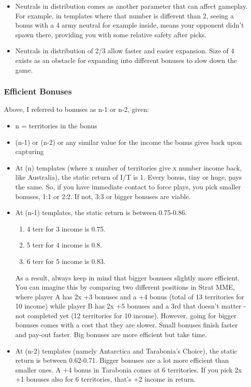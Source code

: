 \begin{itemize}
\begin{enumerate}
\begin{itemize}
            \item Neutrals in distribution comes as another parameter that can affect gameplay. For example, in templates where that number is different than 2, seeing a bonus with a 4 army neutral for example inside, means your opponent didn't spawn there, providing you with some relative safety after picks. 
            \item Neutrals in distribution of 2/3 allow faster and easier expansion. Size of 4 exists as an obstacle for expanding into different bonuses to slow down the game.
        \end{itemize}
    \end{enumerate}
\end{itemize}

\subsubsection{Efficient Bonuses}

Above, I referred to bonuses as n-1 or n-2, given:
\begin{itemize}
    \item n = territories in the bonus
    \item (n-1) or (n-2) or any similar value for the income the bonus gives back upon capturing
\end{itemize}

\begin{itemize}
    \item At (n) templates (where x number of territories give x number income back, like Australia), the static return of I/T is 1. Every bonus, tiny or huge, pays the same. So, if you have immediate contact to force plays, you pick smaller bonuses, 1:1 or 2:2. If not, 3:3 or bigger bonuses are viable.
    \item At (n-1) templates, the static return is between 0.75-0.86. 
    \begin{enumerate}
        \item 4 terr for 3 income is 0.75.
        \item 5 terr for 4 income is 0.8.
        \item 6 terr for 5 income is 0.83.
    \end{enumerate}
    As a result, always keep in mind that bigger bonuses slightly more efficient. You can imagine this by comparing two different positions in Strat MME, where player A has 2x +3 bonuses and a +4 bonus (total of 13 territories for 10 income) while player B has 2x +5 bonuses and a 3rd that doesn't matter - not completed yet (12 territories for 10 income). However, going for bigger bonuses comes with a cost that they are slower. Small bonuses finish faster and pay-out faster. Big bonuses are more efficient but take time. 
    \item At (n-2) templates (namely Antarctica and Tarabonia's Choice), the static return is between 0.62-0.71. Bigger bonuses are a lot more efficient than smaller ones. A +4 bonus in Tarabonia comes at 6 territories. If you pick 2x +1 bonuses also for 6 territories, that's +2 income in return. 
\end{itemize}

